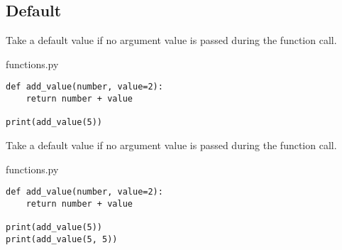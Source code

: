 \documentclass[aspectratio=1610,slidestop]{beamer}
\begin{document}
\subsection{Default}
\begin{pframe}
 Take a default value if no argument value is passed during the function call.
 \medskip

 \begin{minipage}[t]{0.47\textwidth}
  \begin{pythonfile}{functions.py}
   \begin{verbatim}
def add_value(number, value=2):
    return number + value

print(add_value(5))
   \end{verbatim}
  \end{pythonfile}
 \end{minipage}\qquad
 \begin{minipage}[t]{0.47\textwidth}
  \vspace{-2.6cm}
  \begin{terminal}
  \end{terminal}
 \end{minipage}
\end{pframe}


\begin{pframe}
 Take a default value if no argument value is passed during the function call.
 \medskip

 \begin{minipage}[t]{0.47\textwidth}
  \begin{pythonfile}{functions.py}
   \begin{verbatim}
def add_value(number, value=2):
    return number + value

print(add_value(5))
print(add_value(5, 5))
   \end{verbatim}
  \end{pythonfile}
 \end{minipage}\qquad
 \begin{minipage}[t]{0.47\textwidth}
  \vspace{-3.05cm}
  \begin{terminal}
  \end{terminal}
 \end{minipage}
\end{pframe}
\end{document}
